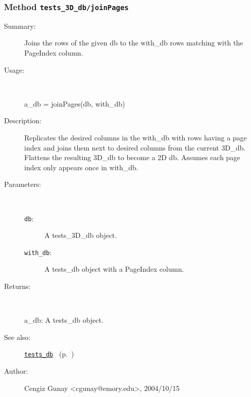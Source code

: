 \subsubsection[Method \texttt{joinPages}]{Method \texttt{tests\_3D\_db/joinPages}}%
%
\label{ref_tests_3D_db__joinPages}%
\hypertarget{ref_tests_3D_db__joinPages}{}%
\begin{description}
\item[Summary:]Joins the rows of the given db to the with\_db rows matching with the PageIndex
 	column.
%
\item[Usage:]~%
\begin{lyxcode}%
a\_db = joinPages(db, with\_db)
%
\end{lyxcode}%
%
\item[Description:]%
Replicates the desired columns in the with\_db with rows having a 
 page index and joins them next to desired columns from the current 3D\_db. Flattens 
 the resulting 3D\_db to become a 2D db. Assumes each page index only 
 appears once in with\_db.
\item[Parameters:]~
\begin{description}%
\item[\texttt{db}:]
 A tests\_3D\_db object.
\item[\texttt{with\_db}:]
 A tests\_db object with a PageIndex column.
\end{description}%
%
\item[Returns:
]~

	a\_db: A tests\_db object.
%
%
\item[See also:]%
\hyperlink{ref_tests_db}{\texttt{tests\_db}}%
\ (p.~\pageref{ref_tests_db})%
%
%
\item[Author:]%
Cengiz Gunay <cgunay@emory.edu>, 2004/10/15
%
\end{description}
\methodline%
